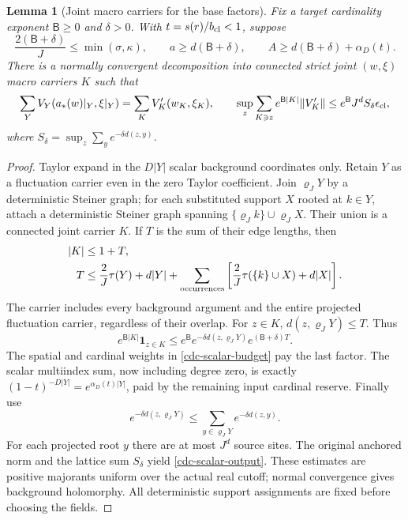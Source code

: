 \documentclass[11pt]{article}
\newtheorem{lemma}[theorem]{Lemma}
\theoremstyle{remark}
\begin{document}
\begin{lemma}[Joint macro carriers for the base factors]
\label{cdc-scalar-lemma}
Fix a target cardinality exponent $\mathsf B\geq0$ and
$\delta>0$. With $t=s(r)/b_{\rm cl}<1$, suppose
\begin{equation}
 \frac{2(\mathsf B+\delta)}J\leq\min(\sigma,\kappa),\qquad
 a\geq d(\mathsf B+\delta),\qquad
 A\geq d(\mathsf B+\delta)+\alpha_D(t).
 \label{cdc-scalar-budget}
\end{equation}
There is a normally convergent decomposition into connected
strict joint $(w,\xi)$ macro carriers $K$ such that
\begin{equation}
 \sum_YV_Y(a_*(w)|_Y,\xi|_Y)=\sum_KV'_K(w_K,\xi_K),
 \qquad
 \sup_z\sum_{K\ni z}e^{\mathsf B|K|}
                         \|V'_K\|
 \leq e^{\mathsf B}J^d S_\delta\epsilon_{\rm cl},
 \label{cdc-scalar-output}
\end{equation}
where $S_\delta=\sup_z\sum_y e^{-\delta d(z,y)}$.
\end{lemma}
\begin{proof}
Taylor expand in the $D|Y|$ scalar background coordinates only.
Retain $Y$ as a fluctuation carrier even in the zero Taylor
coefficient. Join $\varrho_JY$ by a deterministic Steiner graph;
for each substituted support $X$ rooted at $k\in Y$, attach a
deterministic Steiner graph spanning
$\{\varrho_Jk\}\cup\varrho_JX$. Their union is a connected
joint carrier $K$. If $T$ is the sum of their edge lengths, then
\begin{align}
 |K|&\leq1+T,\nonumber\\
 T&\leq\frac2J\tau(Y)+d|Y|
       +\sum_{\rm occurrences}
          \left[\frac2J\tau(\{k\}\cup X)+d|X|\right].
 \label{cdc-joint-tree}
\end{align}
The carrier includes every background argument and the entire
projected fluctuation carrier, regardless of their overlap.
For $z\in K$, $d(z,\varrho_JY)\leq T$. Thus
\begin{equation}
 e^{\mathsf B|K|}\mathbf1_{z\in K}
 \leq e^{\mathsf B}e^{-\delta d(z,\varrho_JY)}
                                      e^{(\mathsf B+\delta)T}.
 \label{cdc-reroot}
\end{equation}
The spatial and cardinal weights in
\eqref{cdc-scalar-budget} pay the last factor. The scalar
multiindex sum, now including degree zero, is exactly
$(1-t)^{-D|Y|}=e^{\alpha_D(t)|Y|}$, paid by the remaining
input cardinal reserve. Finally use
\begin{equation}
 e^{-\delta d(z,\varrho_JY)}
 \leq\sum_{y\in\varrho_JY}e^{-\delta d(z,y)}.
 \label{cdc-anchor-sum}
\end{equation}
For each projected root $y$ there are at most $J^d$ source
sites. The original anchored norm and the lattice sum
$S_\delta$ yield \eqref{cdc-scalar-output}. These estimates
are positive majorants uniform over the actual real cutoff;
normal convergence gives background holomorphy. All deterministic
support assignments are fixed before choosing the fields.
\end{proof}
\end{document}
